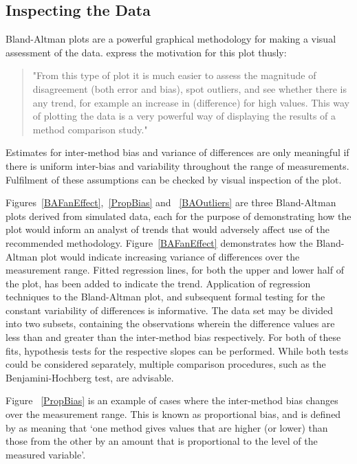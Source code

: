 \documentclass[12pt, a4paper]{report}
\theoremstyle{plain}
\theoremstyle{definition}
\theoremstyle{remark}
\begin{document}
	\subsection{Inspecting the Data}
	Bland-Altman plots are a powerful graphical methodology for making
	a visual assessment of the data. \citet*{BA83} express the
	motivation for this plot thusly:
	\begin{quote}
		"From this type of plot it is much easier to assess the magnitude
		of disagreement (both error and bias), spot outliers, and see
		whether there is any trend, for example an increase in
		(difference) for high values. This way of plotting the data is a
		very powerful way of displaying the results of a method comparison
		study."
	\end{quote}
Estimates for inter-method bias and variance of differences are only meaningful if there is uniform inter-bias and variability throughout the range of measurements. Fulfilment of these assumptions can be checked by visual inspection of the plot.

	
	Figures~\ref{BAFanEffect},~\ref{PropBias} and ~\ref{BAOutliers} are three Bland-Altman plots derived from
	simulated data, each for the purpose of demonstrating how the plot would inform an analyst of trends that would adversely affect use of the recommended methodology. Figure~\ref{BAFanEffect} demonstrates how the Bland-Altman plot would indicate
	increasing variance of differences over the measurement range.
	Fitted regression lines, for both the upper and lower half of the	plot, has been added to indicate the trend. Application of regression techniques to the Bland-Altman plot, and subsequent formal testing for the constant variability of differences is informative. The data set may be divided into two subsets, containing the observations wherein the difference values are less than and greater than the inter-method bias respectively. For both of these fits, hypothesis tests for the respective slopes can be performed. While both tests could be considered separately, multiple comparison procedures, such as the Benjamini-Hochberg \citep{BH} test, are advisable.
	
	Figure ~\ref{PropBias} is an example
	of cases where the inter-method bias changes over the measurement range. This is known as proportional bias, and is defined by \citet{ludbrook97} as meaning that `one method gives
	values that are higher (or lower) than those from the other by an
	amount that is proportional to the level of the measured variable'.
	
\end{document}
